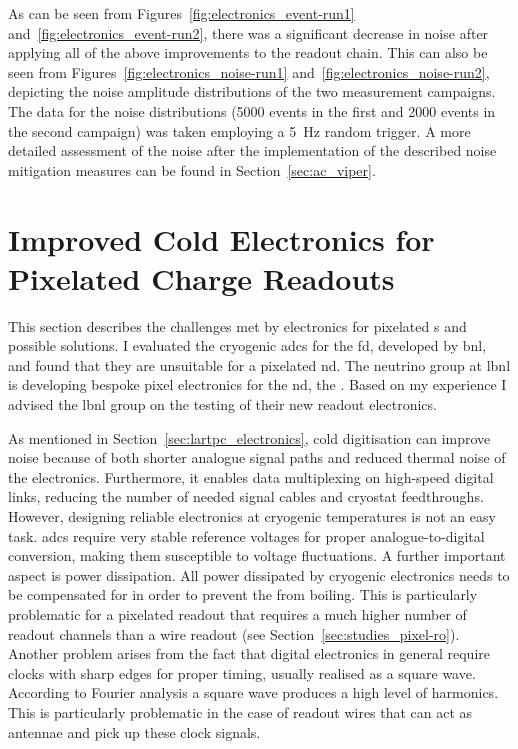 As can be seen from Figures~\ref{fig:electronics_event-run1} and~\ref{fig:electronics_event-run2}, there was a significant decrease in noise after applying all of the above improvements to the readout chain.
This can also be seen from Figures~\ref{fig:electronics_noise-run1} and~\ref{fig:electronics_noise-run2}, depicting the noise amplitude distributions of the two measurement campaigns.
The data for the noise distributions (\num{5000} events in the first and \num{2000} events in the second campaign) was taken employing a \SI{5}{\hertz} random trigger.
A more detailed assessment of the noise after the implementation of the described noise mitigation measures can be found in Section~\ref{sec:ac_viper}.


\section{Improved Cold Electronics for Pixelated Charge Readouts}
\label{sec:studies_pixel-electronics}


This section describes the challenges met by electronics for pixelated \lartpc{}s and possible solutions.
I evaluated the cryogenic \glspl{adc} for the \dune{} \gls{fd}, developed by \gls{bnl}, and found that they are unsuitable for a pixelated \gls{nd}.
The neutrino group at \gls{lbnl} is developing bespoke pixel electronics for the \gls{nd}, the \larpix{}.
Based on my experience I advised the \gls{lbnl} group on the testing of their new readout electronics.

As mentioned in Section~\ref{sec:lartpc_electronics}, cold digitisation can improve noise because of both shorter analogue signal paths and reduced thermal noise of the electronics.
Furthermore, it enables data multiplexing on high-speed digital links, reducing the number of needed signal cables and cryostat feedthroughs.
However, designing reliable electronics at cryogenic temperatures is not an easy task.
\glspl{adc} require very stable reference voltages for proper analogue-to-digital conversion, making them susceptible to voltage fluctuations.
A further important aspect is power dissipation.
All power dissipated by cryogenic electronics needs to be compensated for in order to prevent the \lar{} from boiling.
This is particularly problematic for a pixelated readout that requires a much higher number of readout channels than a wire readout (see Section~\ref{sec:studies_pixel-ro}).
Another problem arises from the fact that digital electronics in general require clocks with sharp edges for proper timing, usually realised as a square wave.
According to Fourier analysis a square wave produces a high level of harmonics.
This is particularly problematic in the case of readout wires that can act as antennae and pick up these clock signals.

